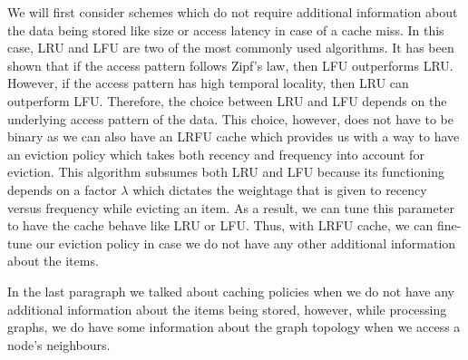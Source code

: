 \medskip
We will first consider schemes which do not require additional information about
the data being stored like size or access latency in case of a cache miss. In
this case, LRU and LFU are two of the most commonly used algorithms. It has been
shown that if the access pattern follows Zipf's law\cite{zipf1929relative}, then
LFU outperforms LRU. However, if the access pattern has high temporal locality,
then LRU can outperform LFU. Therefore, the choice between LRU and LFU depends
on the underlying access pattern of the data. This choice, however, does not
have to be binary as we can also have an LRFU cache\cite{lee2001lrfu} which
provides us with a way to have an eviction policy which takes both recency and
frequency into account for eviction. This algorithm subsumes both LRU and LFU
because its functioning depends on a factor $\lambda$ which dictates the
weightage that is given to recency versus frequency while evicting an item. As a
result, we can tune this parameter to have the cache behave like LRU or LFU.
Thus, with LRFU cache, we can fine-tune our eviction policy in case we do not
have any other additional information about the items.

\medskip
In the last paragraph we talked about caching policies when we do not have any
additional information about the items being stored, however, while processing
graphs, we do have some information about the graph topology when we access a
node's neighbours. 
